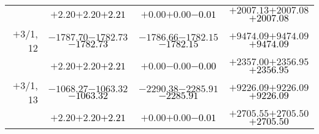 \documentclass[compress]{beamer}
\begin{document}
\begin{frame}
{\begin{tabular}{r | c | c | c}
           & $+2.20$\hspace{0.1 cm}$+2.20$\hspace{0.1 cm}\textcolor{black}{$+2.21$} & $+0.00$\hspace{0.1 cm}$+0.00$\hspace{0.1 cm}\textcolor{black}{$-0.01$} & $+2007.13$\hspace{0.1 cm}$+2007.08$\hspace{0.1 cm}\textcolor{black}{$+2007.08$} \\
$+$3/1, 12 & $-1787.70$\hspace{0.1 cm}$-1782.73$\hspace{0.1 cm}\textcolor{black}{$-1782.73$} & $-1786.66$\hspace{0.1 cm}$-1782.15$\hspace{0.1 cm}\textcolor{black}{$-1782.15$} & $+9474.09$\hspace{0.1 cm}$+9474.09$\hspace{0.1 cm}\textcolor{black}{$+9474.09$} \\
           & $+2.20$\hspace{0.1 cm}$+2.20$\hspace{0.1 cm}\textcolor{black}{$+2.21$} & $+0.00$\hspace{0.1 cm}$-0.00$\hspace{0.1 cm}\textcolor{black}{$-0.00$} & $+2357.00$\hspace{0.1 cm}$+2356.95$\hspace{0.1 cm}\textcolor{black}{$+2356.95$} \\
$+$3/1, 13 & $-1068.27$\hspace{0.1 cm}$-1063.32$\hspace{0.1 cm}\textcolor{black}{$-1063.32$} & $-2290.38$\hspace{0.1 cm}$-2285.91$\hspace{0.1 cm}\textcolor{black}{$-2285.91$} & $+9226.09$\hspace{0.1 cm}$+9226.09$\hspace{0.1 cm}\textcolor{black}{$+9226.09$} \\
           & $+2.20$\hspace{0.1 cm}$+2.20$\hspace{0.1 cm}\textcolor{black}{$+2.21$} & $+0.00$\hspace{0.1 cm}$+0.00$\hspace{0.1 cm}\textcolor{black}{$-0.01$} & $+2705.55$\hspace{0.1 cm}$+2705.50$\hspace{0.1 cm}\textcolor{black}{$+2705.50$} \\

\end{tabular}}
\end{frame}
\end{document}
